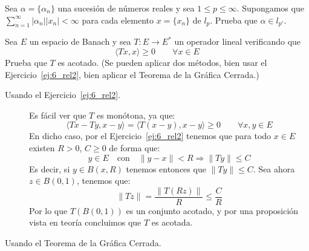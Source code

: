 \begin{ejercicio}
    Sea $\alpha = \{\alpha_n\}$ una sucesión de números reales y sea $1\leq p \leq \infty$. Supongamos que $\sum_{n=1}^{\infty} |\alpha_n||x_n| < \infty$ para cada elemento $x=\{x_n\}$ de $l_p$. Prueba que $\alpha\in l_{p'}$.
\end{ejercicio}

\begin{ejercicio}
    Sea $E$ un espacio de Banach y sea $T:E\to E^\ast$ un operador lineal verificando que
    \begin{equation*}
        \langle Tx, x \rangle \geq 0 \qquad \forall x\in E
    \end{equation*}
    Prueba que $T$ es acotado.\newline
    (Se pueden aplicar dos métodos, bien usar el Ejercicio~\ref{ej:6_rel2}, bien aplicar el Teorema de la Gráfica Cerrada.)

    \begin{description}
        \item [Usando el Ejercicio~\ref{ej:6_rel2}.] Es fácil ver que $T$ es monótona, ya que:
            \begin{equation*}
                \langle Tx-Ty,x-y \rangle  = \langle T(x-y),x-y \rangle \geq 0 \qquad \forall x,y\in E
            \end{equation*}
            En dicho caso, por el Ejercicio~\ref{ej:6_rel2} tenemos que para todo $x\in E$ existen $R>0$, $C\geq 0$ de forma que:
            \begin{equation*}
                y\in E \quad \text{con}\quad \|y-x\|<R \Longrightarrow \|Ty\| \leq C
            \end{equation*}
            Es decir, si $y\in B(x,R)$ tenemos entonces que $\|Ty\| \leq C$. Sea ahora $z\in B(0,1)$, tenemos que:
            \begin{equation*}
                \|Tz\| = \dfrac{\|T(Rz)\|}{R} \leq \dfrac{C}{R}
            \end{equation*}
            Por lo que $T(B(0,1))$ es un conjunto acotado, y por una proposición vista en teoría concluimos que $T$ es acotada.
        \item [Usando el Teorema de la Gráfica Cerrada.]  %



\end{description}
\end{ejercicio}
